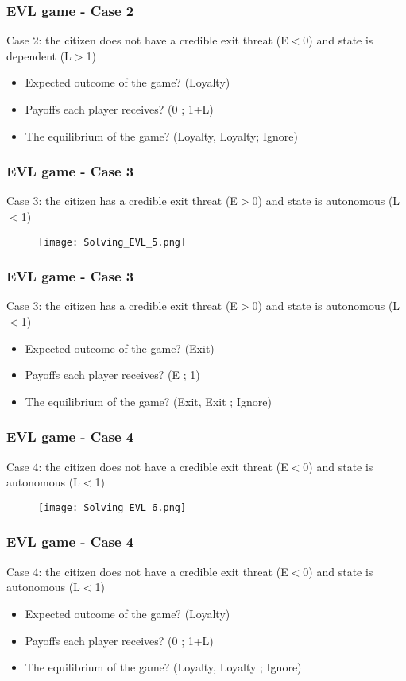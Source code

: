 \documentclass[xcolor=pdftex,dvipsnames]{beamer}
\begin{document}
\begin{frame}
\frametitle{EVL game - Case 2}
Case 2: the citizen does not have a credible exit threat (E$<$0) and state is dependent (L$>$1)
\begin{itemize}
\item Expected outcome of the game? (Loyalty)
\item Payoffs each player receives? (0 ; 1+L)
\item The equilibrium of the game? (Loyalty, Loyalty; Ignore)
\end{itemize}
\end{frame}


\begin{frame}
\frametitle{EVL game - Case 3}
Case 3: the citizen has a credible exit threat (E$>$0) and state is autonomous (L$<$1)
\begin{figure}
\begin{center}
  \texttt{[image: Solving\_EVL\_5.png]}\\
\end{center}
\end{figure}
\end{frame}

\begin{frame}
\frametitle{EVL game - Case 3}
Case 3: the citizen has a credible exit threat (E$>$0) and state is autonomous (L$<$1)
\begin{itemize}
\item Expected outcome of the game? (Exit)
\item Payoffs each player receives? (E ; 1)
\item The equilibrium of the game? (Exit, Exit ; Ignore)
\end{itemize}
\end{frame}


\begin{frame}
\frametitle{EVL game - Case 4}
Case 4: the citizen does not have a credible exit threat (E$<$0) and state is autonomous (L$<$1)
\begin{figure}
\begin{center}
  \texttt{[image: Solving\_EVL\_6.png]}\\
\end{center}
\end{figure}
\end{frame}

\begin{frame}
\frametitle{EVL game - Case 4}
Case 4: the citizen does not have a credible exit threat (E$<$0) and state is autonomous (L$<$1)
\begin{itemize}
\item Expected outcome of the game? (Loyalty)
\item Payoffs each player receives? (0 ; 1+L)
\item The equilibrium of the game? (Loyalty, Loyalty ; Ignore)
\end{itemize}
\end{frame}
\end{document}

